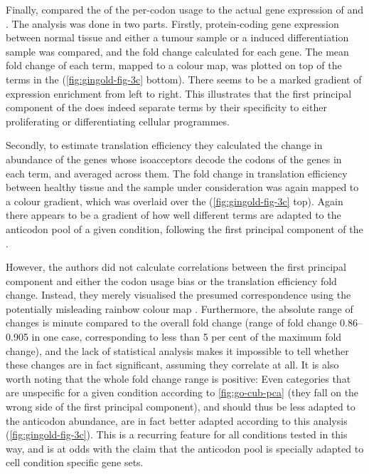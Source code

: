 Finally, \citet{Gingold:2014} compared the \pca of the per-\go codon usage to
the actual gene expression of \mrna[s] and \trna[s]. The analysis was done in
two parts. Firstly, protein-coding gene expression between normal tissue and
either a tumour sample or a induced differentiation sample was compared, and the
fold change calculated for each gene. The mean fold change of each \go term,
mapped to a colour map, was plotted on top of the \go terms in the \pca
(\cref{fig:gingold-fig-3c} bottom). There seems to be a marked gradient of \mrna
expression enrichment from left to right. This illustrates that the first
principal component of the \pca does indeed separate \go terms by their
specificity to either proliferating or differentiating cellular programmes.

Secondly, to estimate translation efficiency they calculated the change in
abundance of the \trna genes whose isoacceptors decode the codons of the genes
in each \go term, and averaged across them. The fold change in translation
efficiency between healthy tissue and the sample under consideration was again
mapped to a colour gradient, which was overlaid over the \pca
(\cref{fig:gingold-fig-3c} top). Again there appears to be a gradient of how
well different \go terms are adapted to the \trna anticodon pool of a given
condition, following the first principal component of the \pca.

However, the authors did not calculate correlations between the first principal
component and either the codon usage bias or the translation efficiency fold
change. Instead, they merely visualised the presumed correspondence using the
potentially misleading rainbow colour map \citep{Borland:2007}. Furthermore, the
absolute range of changes is minute compared to the overall fold change (range
of fold change \numrange{0.86}{0.905} in one case, corresponding to less than
\num{5} per cent of the maximum fold change), and the lack of statistical
analysis makes it impossible to tell whether these changes are in fact
significant, assuming they correlate at all. It is also worth noting that the
whole fold change range is positive: Even \go categories that are unspecific for
a given condition according to \cref{fig:go-cub-pca} (they fall on the wrong
side of the first principal component), and should thus be less adapted to the
\trna anticodon abundance, are in fact better adapted according to this analysis
(\cref{fig:gingold-fig-3c}). This is a recurring feature for all conditions
tested in this way, and is at odds with the claim that the \trna anticodon pool
is specially adapted to cell condition specific gene sets.

